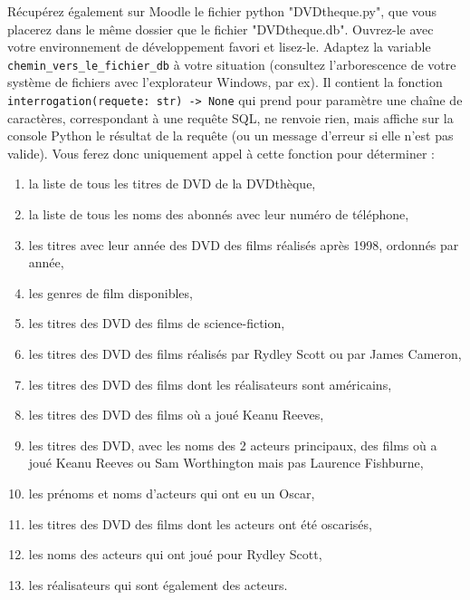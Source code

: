 \documentclass[french,11pt,twoside]{VcCours}
\begin{document}
Récupérez également sur Moodle le fichier python "DVDtheque.py", que vous placerez dans le même dossier que le fichier "DVDtheque.db". Ouvrez-le avec votre environnement de développement favori et lisez-le. Adaptez la variable \verb'chemin_vers_le_fichier_db' à votre situation (consultez l'arborescence de votre système de fichiers avec l'explorateur Windows, par ex). Il contient la fonction \verb'interrogation(requete: str) -> None' qui prend pour paramètre une chaîne de caractères, correspondant à une requête SQL, ne renvoie rien, mais affiche sur la console Python le résultat de la requête (ou un message d'erreur si elle n'est pas valide). Vous ferez donc uniquement appel à cette fonction pour déterminer : 
\begin{enumerate}
 \item la liste de tous les titres de DVD de la DVDthèque,
 \item la liste de tous les noms des abonnés avec leur numéro de téléphone,
 \item les titres avec leur année des DVD des films réalisés après 1998, ordonnés par année,
 \item les genres de film disponibles,
 \item les titres des DVD des films de science-fiction,
 \item les titres des DVD des films réalisés par Rydley Scott ou par James Cameron,
 \item les titres des DVD des films dont les réalisateurs sont américains,
 \item les titres des DVD des films où a joué Keanu Reeves,
 \item les titres des DVD, avec les noms des 2 acteurs principaux, des films où a joué Keanu Reeves ou Sam Worthington mais pas Laurence Fishburne,
 \item les prénoms et noms d'acteurs qui ont eu un Oscar,
 \item les titres des DVD des films dont les acteurs ont été oscarisés,
 \item les noms des acteurs qui ont joué pour Rydley Scott,
 \item les réalisateurs qui sont également des acteurs.
\end{enumerate}
\end{document}
